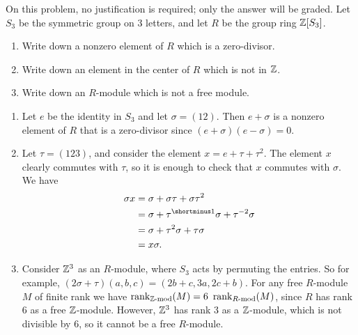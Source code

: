%
\begin{question}[subtitle = January 2020 Problem 1,ID=Jan20_1]
On this problem, no justification is required; only the answer will be graded. Let $S_3$ be the symmetric group on 3 letters, and let $R$ be the group ring $\mathbb{Z}[S_3]$.
\begin{enumerate}
    \item Write down a nonzero element of $R$ which is a zero-divisor.
    \item Write down an element in the center of $R$ which is not in $\mathbb{Z}$.
    \item Write down an $R$-module which is not a free module.
\end{enumerate}
\end{question}
\begin{solution}
\begin{enumerate}
    \item Let $e$ be the identity in $S_3$ and let $\sigma = (12)$. Then $e+\sigma$ is a nonzero element of $R$ that is a zero-divisor since $(e+\sigma)(e-\sigma)=0$.
    \item Let $\tau = (123)$, and consider the element $x = e + \tau + \tau^2$. The element $x$ clearly commutes with $\tau$, so it is enough to check that $x$ commutes with $\sigma$. We have
    \begin{align*}
        \sigma x &= \sigma + \sigma \tau + \sigma \tau^2\\
        &= \sigma + \tau\inv \sigma + \tau^{-2} \sigma\\
        &= \sigma + \tau^2 \sigma + \tau \sigma\\
        &= x \sigma.
    \end{align*}
    \item Consider $\mathbb{Z}^3$ as an $R$-module, where $S_3$ acts by permuting the entries. So for example, $(2\sigma + \tau)(a,b,c) = (2b+c,3a,2c+b)$. For any free $R$-module $M$ of finite rank we have $\rank_{\Z\text{-mod}}(M) = 6\ \rank_{R\text{-mod}}(M)$, since $R$ has rank $6$ as a free $\mathbb{Z}$-module. However, $\mathbb{Z}^3$ has rank 3 as a $\mathbb{Z}$-module, which is not divisible by 6, so it cannot be a free $R$-module.
\end{enumerate}
\end{solution}

